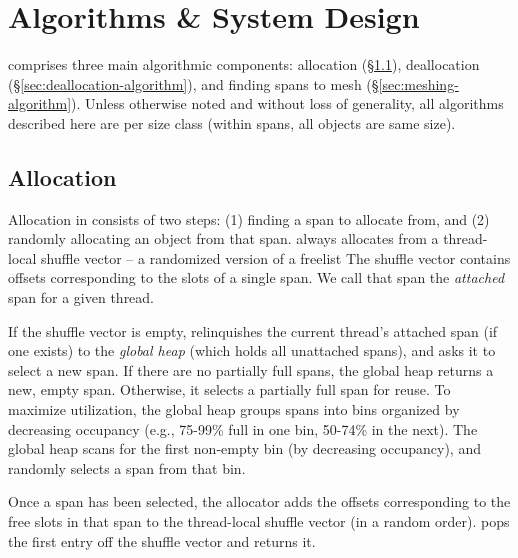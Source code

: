 \section{Algorithms \& System Design}
\label{sec:algorithms}


\Mesh{} comprises three main algorithmic components: allocation
(\S\ref{sec:allocation-algorithm}), deallocation
(\S\ref{sec:deallocation-algorithm}), and finding spans to mesh
(\S\ref{sec:meshing-algorithm}). Unless otherwise noted and without
loss of generality, all algorithms described here are per size class
(within spans, all objects are same size).

\subsection{Allocation}
\label{sec:allocation-algorithm}

Allocation in \Mesh{} consists of two steps: (1) finding a span to
allocate from, and (2) randomly allocating an object from that span.
\Mesh{} always allocates from a thread-local shuffle vector -- a
randomized version of a freelist %
The shuffle vector contains offsets
corresponding to the slots of a single span.  We call that span the
\emph{attached} span for a given thread.

If the shuffle vector is empty, \Mesh relinquishes the current
thread's attached span (if one exists) to the \emph{global heap}
(which holds all unattached spans), and asks it to select a new
span. If there are no partially full spans, the global heap returns a
new, empty span.  Otherwise, it selects a partially full span for
reuse. To maximize utilization, the global heap groups spans into bins
organized by decreasing occupancy (e.g., 75-99\% full in one bin,
50-74\% in the next). The global heap scans for the first non-empty
bin (by decreasing occupancy), and randomly selects a span from that
bin.

Once a span has been selected, the allocator adds the offsets
corresponding to the free slots in that span to the thread-local
shuffle vector (in a random order). \Mesh{} pops the first entry off
the shuffle vector and returns it.


